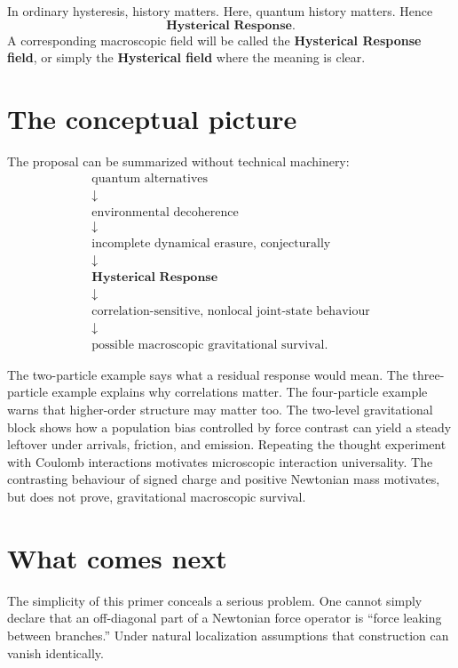 \documentclass[11pt]{article}
\begin{document}
In ordinary hysteresis, history matters. Here, quantum history matters. Hence
\begin{equation}
\boxed{\textbf{Hysterical Response}.}
\end{equation}
A corresponding macroscopic field will be called the \textbf{Hysterical Response field}, or simply the \textbf{Hysterical field} where the meaning is clear.

\section{The conceptual picture}
The proposal can be summarized without technical machinery:
\begin{equation}
\begin{gathered}
\text{quantum alternatives}\\
\downarrow\\
\text{environmental decoherence}\\
\downarrow\\
\text{incomplete dynamical erasure, conjecturally}\\
\downarrow\\
\textbf{Hysterical Response}\\
\downarrow\\
\text{correlation-sensitive, nonlocal joint-state behaviour}\\
\downarrow\\
\text{possible macroscopic gravitational survival.}
\end{gathered}
\end{equation}

The two-particle example says what a residual response would mean. The three-particle example explains why correlations matter. The four-particle example warns that higher-order structure may matter too. The two-level gravitational block shows how a population bias controlled by force contrast can yield a steady leftover under arrivals, friction, and emission. Repeating the thought experiment with Coulomb interactions motivates microscopic interaction universality. The contrasting behaviour of signed charge and positive Newtonian mass motivates, but does not prove, gravitational macroscopic survival.

\section{What comes next}
The simplicity of this primer conceals a serious problem. One cannot simply declare that an off-diagonal part of a Newtonian force operator is ``force leaking between branches.'' Under natural localization assumptions that construction can vanish identically.
\end{document}
